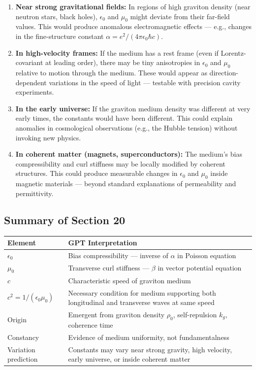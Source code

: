 \documentclass[12pt, a4paper]{article}
\begin{document}
\begin{enumerate}
    \item \textbf{Near strong gravitational fields:} In regions of high graviton density (near neutron stars, black holes), \( \epsilon_0 \) and \( \mu_0 \) might deviate from their far-field values. This would produce anomalous electromagnetic effects — e.g., changes in the fine-structure constant \( \alpha = e^2/(4\pi \epsilon_0 \hbar c) \).
    
    \item \textbf{In high-velocity frames:} If the medium has a rest frame (even if Lorentz-covariant at leading order), there may be tiny anisotropies in \( \epsilon_0 \) and \( \mu_0 \) relative to motion through the medium. These would appear as direction-dependent variations in the speed of light — testable with precision cavity experiments.
    
    \item \textbf{In the early universe:} If the graviton medium density was different at very early times, the constants would have been different. This could explain anomalies in cosmological observations (e.g., the Hubble tension) without invoking new physics.
    
    \item \textbf{In coherent matter (magnets, superconductors):} The medium's bias compressibility and curl stiffness may be locally modified by coherent structures. This could produce measurable changes in \( \epsilon_0 \) and \( \mu_0 \) inside magnetic materials — beyond standard explanations of permeability and permittivity.
\end{enumerate}

\subsection{Summary of Section 20}
\label{subsec:summary_20}

\begin{center}
\begin{tabular}{|p{4cm}|p{10cm}|}
\hline
\textbf{Element} & \textbf{GPT Interpretation} \\
\hline
\( \epsilon_0 \) & Bias compressibility — inverse of \( \alpha \) in Poisson equation \\
\hline
\( \mu_0 \) & Transverse curl stiffness — \( \beta \) in vector potential equation \\
\hline
\( c \) & Characteristic speed of graviton medium \\
\hline
\( c^2 = 1/(\epsilon_0 \mu_0) \) & Necessary condition for medium supporting both longitudinal and transverse waves at same speed \\
\hline
Origin & Emergent from graviton density \( \rho_0 \), self-repulsion \( k_g \), coherence time \\
\hline
Constancy & Evidence of medium uniformity, not fundamentalness \\
\hline
Variation prediction & Constants may vary near strong gravity, high velocity, early universe, or inside coherent matter \\
\hline
\end{tabular}
\end{center}
\end{document}
